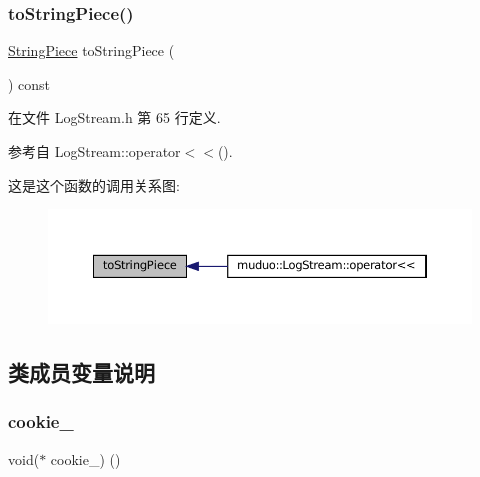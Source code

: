 \subsubsection{\texorpdfstring{to\+String\+Piece()}{toStringPiece()}}
{\footnotesize\ttfamily \hyperlink{classmuduo_1_1StringPiece}{String\+Piece} to\+String\+Piece (\begin{DoxyParamCaption}{ }\end{DoxyParamCaption}) const\hspace{0.3cm}{\ttfamily [inline]}}



在文件 Log\+Stream.\+h 第 65 行定义.



参考自 Log\+Stream\+::operator$<$$<$().

这是这个函数的调用关系图\+:
\nopagebreak
\begin{figure}[H]
\begin{center}
\leavevmode
\includegraphics[width=350pt]{classmuduo_1_1detail_1_1FixedBuffer_a78096dee3d0826efb63a5b814eef37c4_icgraph}
\end{center}
\end{figure}


\subsection{类成员变量说明}
\mbox{\label{classmuduo_1_1detail_1_1FixedBuffer_a5684debf5a7e739505cba6c024a3f7f8}} 
\subsubsection{\texorpdfstring{cookie\+\_\+}{cookie\_}}
{\footnotesize\ttfamily void($\ast$ cookie\+\_\+) ()\hspace{0.3cm}{\ttfamily [private]}}



